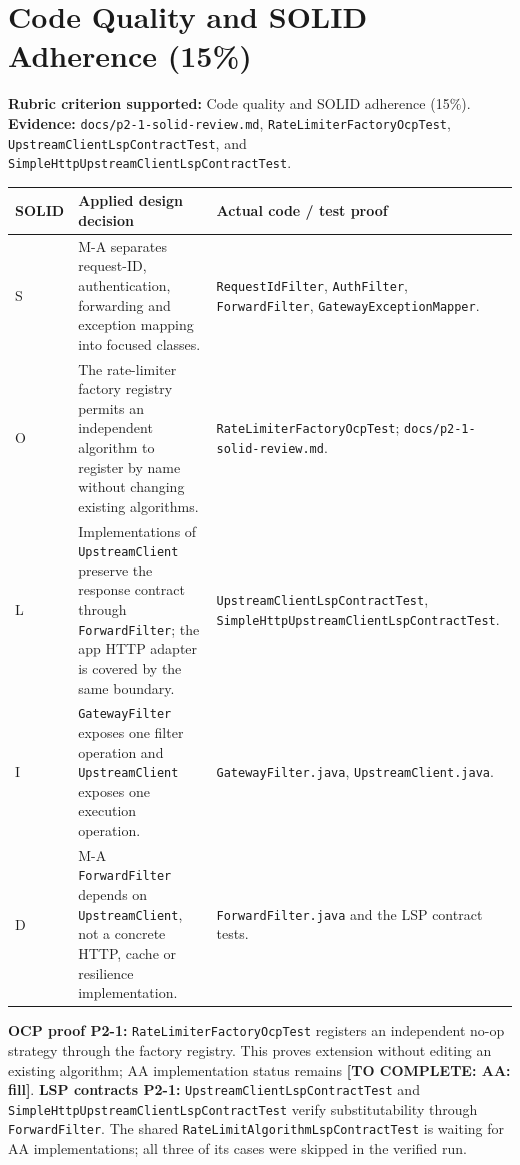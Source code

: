 \documentclass[12pt,a4paper]{article}
\newcommand{\cls}[1]{\nolinkurl{#1}}
\newcommand{\todo}[1]{\textcolor{red!70!black}{\textbf{[TO COMPLETE: #1]}}}
\begin{document}
\section{Code Quality and SOLID Adherence (15\%)}\label{sec:solid}
\textbf{Rubric criterion supported:} Code quality and SOLID adherence (15\%). \textbf{Evidence:} \cls{docs/p2-1-solid-review.md}, \cls{RateLimiterFactoryOcpTest}, \cls{UpstreamClientLspContractTest}, and \cls{SimpleHttpUpstreamClientLspContractTest}.
\begin{longtable}{L{1cm} L{5.6cm} L{5.7cm}}\toprule
\textbf{SOLID} & \textbf{Applied design decision} & \textbf{Actual code / test proof}\\\midrule\endhead
S & M-A separates request-ID, authentication, forwarding and exception mapping into focused classes. & \cls{RequestIdFilter}, \cls{AuthFilter}, \cls{ForwardFilter}, \cls{GatewayExceptionMapper}.\\
O & The rate-limiter factory registry permits an independent algorithm to register by name without changing existing algorithms. & \cls{RateLimiterFactoryOcpTest}; \cls{docs/p2-1-solid-review.md}.\\
L & Implementations of \cls{UpstreamClient} preserve the response contract through \cls{ForwardFilter}; the app HTTP adapter is covered by the same boundary. & \cls{UpstreamClientLspContractTest}, \cls{SimpleHttpUpstreamClientLspContractTest}.\\
I & \cls{GatewayFilter} exposes one filter operation and \cls{UpstreamClient} exposes one execution operation. & \cls{GatewayFilter.java}, \cls{UpstreamClient.java}.\\
D & M-A \cls{ForwardFilter} depends on \cls{UpstreamClient}, not a concrete HTTP, cache or resilience implementation. & \cls{ForwardFilter.java} and the LSP contract tests.\\\bottomrule\end{longtable}
\textbf{OCP proof P2-1:} \cls{RateLimiterFactoryOcpTest} registers an independent no-op strategy through the factory registry. This proves extension without editing an existing algorithm; AA implementation status remains \todo{AA: fill}.
\textbf{LSP contracts P2-1:} \cls{UpstreamClientLspContractTest} and \cls{SimpleHttpUpstreamClientLspContractTest} verify substitutability through \cls{ForwardFilter}. The shared \cls{RateLimitAlgorithmLspContractTest} is waiting for AA implementations; all three of its cases were skipped in the verified run.
\end{document}

